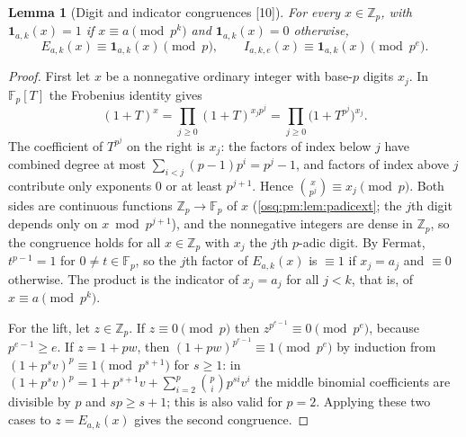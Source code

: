 \documentclass[11pt,letterpaper]{article}
\numberwithin{equation}{section}
\newtheorem{lemma}[lemma]{Lemma}
\theoremstyle{definition}
\theoremstyle{remark}
\theoremstyle{plain}
\newcommand{\Z}{\mathbb Z}
\newcommand{\F}{\mathbb F}
\newcommand{\src}[1]{\textup{\textsf{[#1]}}}
\begin{document}
\begin{lemma}[Digit and indicator congruences \src{10}]\label{osq:pm:lem:indicator}
For every $x\in\Z_p$, with $\mathbf 1_{a,k}(x)=1$ if $x\equiv a\pmod{p^k}$ and
$\mathbf 1_{a,k}(x)=0$ otherwise,
\[
 E_{a,k}(x)\equiv\mathbf 1_{a,k}(x)\pmod p,
 \qquad
 I_{a,k,e}(x)\equiv\mathbf 1_{a,k}(x)\pmod{p^e}.
\]
\end{lemma}
\begin{proof}
First let $x$ be a nonnegative ordinary integer with base-$p$ digits $x_j$. In
$\F_p[T]$ the Frobenius identity gives
\[
 (1+T)^x=\prod_{j\ge0}(1+T)^{x_jp^j}=\prod_{j\ge0}\bigl(1+T^{p^j}\bigr)^{x_j}.
\]
The coefficient of $T^{p^j}$ on the right is $x_j$: the factors of index below $j$ have
combined degree at most $\sum_{i<j}(p-1)p^i=p^j-1$, and factors of index above $j$
contribute only exponents $0$ or at least $p^{j+1}$. Hence $\binom x{p^j}\equiv
x_j\pmod p$. Both sides are continuous functions $\Z_p\to\F_p$ of $x$
(\cref{osq:pm:lem:padicext}; the $j$th digit depends only on $x\bmod p^{j+1}$), and the
nonnegative integers are dense in $\Z_p$, so the congruence holds for all $x\in\Z_p$ with
$x_j$ the $j$th $p$-adic digit. By Fermat, $t^{p-1}=1$ for $0\ne t\in\F_p$, so the $j$th
factor of $E_{a,k}(x)$ is $\equiv1$ if $x_j=a_j$ and $\equiv0$ otherwise. The product is
the indicator of $x_j=a_j$ for all $j<k$, that is, of $x\equiv a\pmod{p^k}$.

For the lift, let $z\in\Z_p$. If $z\equiv0\pmod p$ then $z^{p^{e-1}}\equiv0\pmod{p^e}$,
because $p^{e-1}\ge e$. If $z=1+pw$, then $(1+pw)^{p^{e-1}}\equiv1\pmod{p^e}$ by
induction from $(1+p^sv)^p\equiv1\pmod{p^{s+1}}$ for $s\ge1$: in
$(1+p^sv)^p=1+p^{s+1}v+\sum_{i=2}^{p}\binom pi p^{si}v^i$ the middle binomial coefficients
are divisible by $p$ and $sp\ge s+1$; this is also valid for $p=2$. Applying these two
cases to $z=E_{a,k}(x)$ gives the second congruence.
\end{proof}
\end{document}
